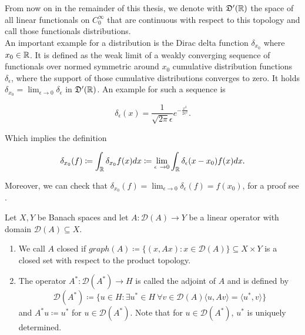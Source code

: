 From now on in the remainder of this thesis, we denote with $\mathfrak{D}'(\mathbb{R})$ the space of all linear functionals on $C_{0}^{\infty}$ that are continuous with respect to this topology and call those functionals distributions. 
~\\

An important example for a distribution is the Dirac delta function $\delta_{x_{0}}$ where $x_{0} \in \mathbb{R}$. It is defined as the weak limit of a weakly converging sequence of functionals over normed symmetric around $x_{0}$ cumulative distribution functions $\delta_{\epsilon}$, where the support of those cumulative distributions converges to zero. It holds $\delta_{x_{0}} = \lim_{\epsilon \rightarrow 0} \delta_{\epsilon}$ in $\mathfrak{D}'(\mathbb{R})$. An example for such a sequence is %

	\begin{equation}
		\delta_{\epsilon}(x) = \frac{1}{\sqrt{2 \pi} \epsilon} e^{-\frac{x^{2}}{2 \epsilon^{2}}}. \label{smooth-potential}
	\end{equation}
	 
Which implies the definition

	\[ \delta_{x_{0}}(f) \coloneqq \int_{\R} \delta_{x_{0}} f(x) dx \coloneqq \lim_{\epsilon \rightarrow 0} \int_{\R} \delta_{\epsilon}(x - x_{0}) f(x) dx. \]
	
Moreover, we can check that $\delta_{x_{0}}(f) = \lim_{\epsilon \rightarrow 0} \delta_{\epsilon}(f) = f(x_{0})$, for a proof see \cite[Chap. 1.4]{WeisST}.

\begin{definition} %
Let $X, Y$ be Banach spaces and let $A \colon \mathcal{D}(A) \rightarrow Y$ be a linear operator with domain $\mathcal{D}(A) \subseteq X$. 
	\begin{enumerate}[label=\alph*\upshape)]
		\item We call $A$ closed if $graph(A) \coloneqq \{ (x, Ax) : x \in \mathcal{D}(A) \} \subseteq X \times Y$ is a closed set with respect to the product topology.
		\item The operator $A^{*} : \mathcal{D}(A^{*}) \rightarrow H $ is called the adjoint of $A$ and is defined by
		\[ \mathcal{D}(A^{*}) \coloneqq \{ u \in H : \exists u^{*} \in H ~\forall v \in \mathcal{D}(A) \langle u, A v \rangle = \langle u^{*} , v \rangle \} \]
		and $A^{*} u \coloneqq u^{*}$ for $u \in \mathcal{D}(A^{*})$. Note that for $u \in \mathcal{D}(A^{*})$, $u^{*}$ is uniquely determined. 
	\end{enumerate}
\end{definition}

